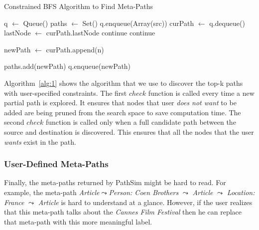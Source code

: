 \begin{algorithm}
    \caption{Constrained BFS Algorithm to Find Meta-Paths}
    \label{alg:1}
    \begin{algorithmic}[1]
            \State q $\gets$ Queue()
            \State paths $\gets$ Set()
            \State q.enqueue(Array(src))
            \State
                \State curPath $\gets$ q.dequeue()
                \State lastNode $\gets$ curPath.lastNode
                        \State continue
                        \State continue
                    \EndIf
                    \State

                    \State newPath $\gets$ curPath.append(n)

                            \State paths.add(newPath)
                        \EndIf
                    \Else
                        \State q.enqueue(newPath)
                    \EndIf
                \EndFor
            \EndWhile
            \State
            \State {}
        \EndFunction
    \end{algorithmic}
\end{algorithm}

Algorithm~\ref{alg:1} shows the algorithm that we use to discover the top-k
paths with user-specified constraints. The first $check$ function
is called every time a new partial path is explored. It ensures that nodes
that user \textit{does not want} to be added are being pruned from the search
space to save computation time. The second $check$ function
is called only when a full candidate path between the source and destination
is discovered. This ensures that all the nodes that the user \textit{wants}
exist in the path.

\subsubsection{User-Defined Meta-Paths}
\label{sec:user_metapaths}

Finally, the meta-paths returned by PathSim might be hard to read.
For example, the meta-path \textit{Article}$ \leadsto $\textit{Person: Coen Brothers}
 $\leadsto$ \textit{Article} $\leadsto$ \textit{Location: France} $\leadsto$ \textit{Article} 
is hard to understand at a glance. However, if the user realizes that this meta-path talks
about the \textit{Cannes Film Festival} then he can replace that meta-path with this more 
meaningful label.

